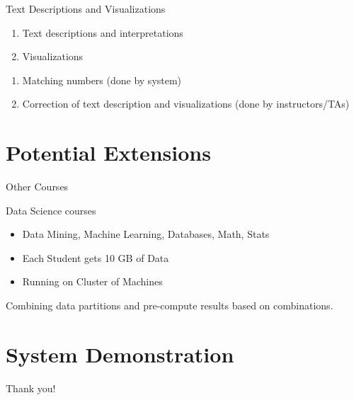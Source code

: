 \documentclass[9pt]{beamer}
\begin{document}

\begin{frame}[fragile]{Text Descriptions and Visualizations}


\begin{enumerate}
  \item Text descriptions and interpretations  
  \item Visualizations    
\end{enumerate}



\begin{enumerate}
  \item Matching numbers (done by system)
  \item Correction of text description and visualizations (done by instructors/TAs) 
\end{enumerate}
 


\end{frame}




\section{Potential Extensions}




\begin{frame}[fragile]{Other Courses }

Data Science courses 

\begin{itemize}

  \item Data Mining, Machine Learning, Databases, Math, Stats   
\end{itemize}



\begin{itemize}
  \item Each Student gets 10 GB of Data 
  \item Running on Cluster of Machines  
\end{itemize}
 
  Combining data partitions and pre-compute results based on combinations.  
 


\end{frame}


\section{System Demonstration}



\begin{frame}[fragile]{}

\centering
\Huge 
Thank you!

\end{frame}
\end{document}
